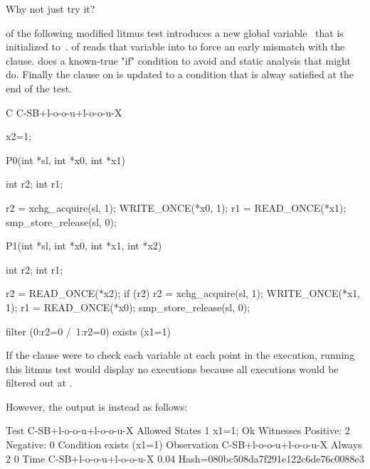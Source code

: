 Why not just try it?
\begin{fcvref}
 of the following modified litmus test
introduces a new global variable~ that is initialized to~.
 of  reads that variable into  to force
an early mismatch with the  clause.
 does a known-true "if" condition to avoid and static analysis
that  might do.
Finally the  clause on  is updated to a condition
that is alway satisfied at the end of the test.

\begin{fcvlabel}
\begin{VerbatimN}[commandchars=\%\@\$]
	C C-SB+l-o-o-u+l-o-o-u-X

	{
		x2=1;    %
	}

	P0(int *sl, int *x0, int *x1)
	{
		int r2;
		int r1;

		r2 = xchg_acquire(sl, 1);
		WRITE_ONCE(*x0, 1);
		r1 = READ_ONCE(*x1);
		smp_store_release(sl, 0);
	}

	P1(int *sl, int *x0, int *x1, int *x2)
	{
		int r2;
		int r1;

		r2 = READ_ONCE(*x2);    %
		if (r2)                 %
			r2 = xchg_acquire(sl, 1);
		WRITE_ONCE(*x1, 1);
		r1 = READ_ONCE(*x0);
		smp_store_release(sl, 0);
	}

	filter (0:r2=0 /\ 1:r2=0)
	exists (x1=1)                  %
\end{VerbatimN}
\end{fcvlabel}

If the  clause were to check each variable at each point in the
execution, running this litmus test would display no executions because
all executions would be filtered out at .
\end{fcvref}
However, the output is instead as follows:

\begin{fcvlabel}
\begin{VerbatimN}[commandchars=\%\@\$]
	Test C-SB+l-o-o-u+l-o-o-u-X Allowed
	States 1
	x1=1;                 %
	Ok
	Witnesses
	Positive: 2 Negative: 0
	Condition exists (x1=1)
	Observation C-SB+l-o-o-u+l-o-o-u-X Always 2 0
	Time C-SB+l-o-o-u+l-o-o-u-X 0.04
	Hash=080bc508da7f291e122c6de76c0088e3
\end{VerbatimN}
\end{fcvlabel}

